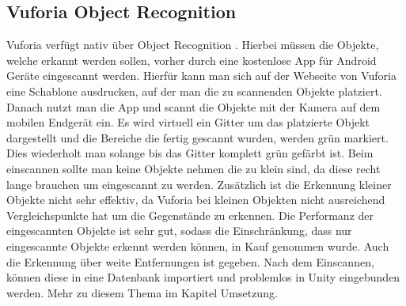 \subsection{Vuforia Object Recognition}
\label{sec:vufObjRec}
Vuforia verfügt nativ über Object Recognition \cite{VufObjRec}. Hierbei müssen die Objekte, welche erkannt werden sollen, vorher durch eine kostenlose App für Android Geräte eingescannt werden. Hierfür kann man sich auf der Webseite von Vuforia eine Schablone ausdrucken, auf der man die zu scannenden Objekte platziert. Danach nutzt man die App und scannt die Objekte mit der Kamera auf dem mobilen Endgerät ein. Es wird virtuell ein Gitter um das platzierte Objekt dargestellt und die Bereiche die fertig gescannt wurden, werden grün markiert. Dies wiederholt man solange bis das Gitter komplett grün gefärbt ist.  Beim einscannen sollte man keine Objekte nehmen die zu klein sind, da diese recht lange brauchen um eingescannt zu werden. Zusätzlich ist die Erkennung kleiner Objekte nicht sehr effektiv, da Vuforia bei kleinen Objekten nicht ausreichend Vergleichspunkte hat um die Gegenstände zu erkennen. Die Performanz der eingescannten Objekte ist sehr gut, sodass die Einschränkung, dass nur eingescannte Objekte erkennt werden können, in Kauf genommen wurde. Auch die Erkennung über weite Entfernungen ist gegeben. Nach dem Einscannen, können diese in eine Datenbank importiert und problemlos in Unity eingebunden werden. Mehr zu diesem Thema im Kapitel Umsetzung.
